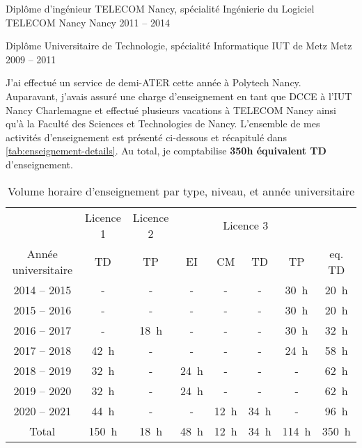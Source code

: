 \documentclass[12pt, a4paper]{awesome-cv}
\begin{document}

\begin{cventries}

\cventry
    {Diplôme d'ingénieur TELECOM Nancy, spécialité Ingénierie du Logiciel} %
    {TELECOM Nancy} %
    {Nancy} %
    {2011 – 2014} %
    {}

\cventry
  {Diplôme Universitaire de Technologie, spécialité Informatique} %
  {IUT de Metz} %
  {Metz} %
  {2009 – 2011} %
  {}
\end{cventries}



\begin{cvparagraph}
  J'ai effectué un service de demi-ATER cette année à Polytech Nancy.
  Auparavant, j'avais assuré une charge d'enseignement en tant que DCCE à l'IUT Nancy Charlemagne et effectué plusieurs vacations à TELECOM Nancy ainsi qu'à la Faculté des Sciences et Technologies de Nancy.
  L'ensemble de mes activités d'enseignement est présenté ci-dessous et récapitulé dans \autoref{tab:enseignement-details}.
  Au total, je comptabilise \textbf{350h équivalent TD} d'enseignement.
\end{cvparagraph}

\begin{table}[ht]
  \centering
  \begin{tabular}{ c | c | c | c c c c | c }
    & Licence 1 & Licence 2 & \multicolumn{4}{c|}{Licence 3} \\
    Année universitaire & TD & TP & EI & CM & TD & TP & eq. TD  \\
    \hline
    2014 -- 2015 & - & - & - & - & - & 30~h & 20~h\\
    2015 -- 2016 & - & - & - & - & - & 30~h & 20~h\\
    2016 -- 2017 & - & 18~h & - & - & - & 30~h & 32~h\\
    2017 -- 2018 & 42~h & - & - & - & - & 24~h & 58~h\\
    2018 -- 2019 & 32~h & - & 24~h & - & - & - & 62~h\\
    2019 -- 2020 & 32~h & - & 24~h & - & - & - & 62~h\\
    2020 -- 2021 & 44~h & - & - & 12~h & 34~h & - & 96~h\\
    \hline
    Total  & 150~h & 18~h & 48~h & 12~h & 34~h & 114~h & 350~h\\
  \end{tabular}
  \caption{Volume horaire d'enseignement par type, niveau, et année universitaire}\label{tab:enseignement-details}
\end{table}
\end{document}
